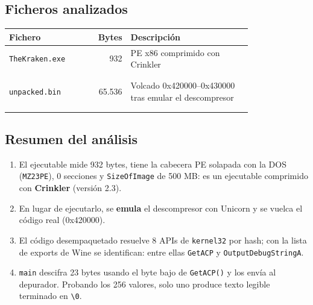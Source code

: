 \documentclass[11pt,a4paper]{article}
\begin{document}
\subsection{Ficheros analizados}
\begin{longtable}{@{}L{0.30\linewidth}r L{0.50\linewidth}@{}}
\toprule \textbf{Fichero} & \textbf{Bytes} & \textbf{Descripción} \\ \midrule \endhead
\texttt{TheKraken.exe} & 932 & PE x86 comprimido con Crinkler \\ \nopagebreak
{} \\ \nopagebreak
{} \\ \midrule
\texttt{unpacked.bin} & 65.536 & Volcado 0x420000--0x430000 tras emular el descompresor \\ \nopagebreak
{} \\ \nopagebreak
{} \\ \midrule
\end{longtable}

\subsection{Resumen del análisis}
\begin{enumerate}
  \item El ejecutable mide 932 bytes, tiene la cabecera PE solapada con la DOS (\texttt{MZ23PE}), 0 secciones y
        \texttt{SizeOfImage} de 500 MB: es un ejecutable comprimido con \textbf{Crinkler} (versión 2.3).
  \item En lugar de ejecutarlo, se \textbf{emula} el descompresor con Unicorn y se vuelca el código real (0x420000).
  \item El código desempaquetado resuelve 8 APIs de \texttt{kernel32} por hash; con la lista de exports de Wine se
        identifican: entre ellas \texttt{GetACP} y \texttt{OutputDebugStringA}.
  \item \texttt{main} descifra 23 bytes usando el byte bajo de \texttt{GetACP()} y los envía al depurador. Probando los
        256 valores, solo uno produce texto legible terminado en \texttt{\textbackslash 0}.
\end{enumerate}
\end{document}
